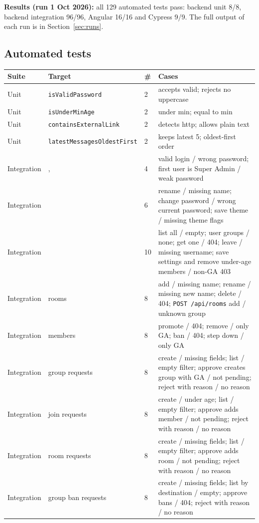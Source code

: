 \documentclass[10pt,a4paper]{article}
\newcommand{\ep}[1]{\texttt{\small #1}}
\begin{document}
\textbf{Results (run 1 Oct 2026):} all 129 automated tests pass: backend unit 8/8, backend integration 96/96, Angular 16/16 and Cypress 9/9. The full output of each run is in Section~\ref{sec:runs}.

\subsection{Automated tests}
\small
\begin{longtable}{L{1.8cm} L{4.2cm} L{0.5cm} L{8.8cm}}
\toprule
\textbf{Suite} & \textbf{Target} & \textbf{\#} & \textbf{Cases}\\
\midrule
\endhead
Unit & \ep{isValidPassword} & 2 & accepts valid; rejects no uppercase\\
Unit & \ep{isUnderMinAge} & 2 & under min; equal to min\\
Unit & \ep{containsExternalLink} & 2 & detects http; allows plain text\\
Unit & \ep{latestMessagesOldestFirst} & 2 & keeps latest 5; oldest-first order\\
\midrule
Integration & ,  & 4 & valid login / wrong password; first user is Super Admin / weak password\\
Integration &  & 6 & rename / missing name; change password / wrong current password; save theme / missing theme flags\\
Integration &  & 10 & list all / empty; user groups / none; get one / 404; leave / missing username; save settings and remove under-age members / non-GA 403\\
Integration & rooms & 8 & add / missing name; rename / missing new name; delete / 404; \ep{POST /api/rooms} add / unknown group\\
Integration & members & 8 & promote / 404; remove / only GA; ban / 404; step down / only GA\\
Integration & group requests & 8 & create / missing fields; list / empty filter; approve creates group with GA / not pending; reject with reason / no reason\\
Integration & join requests & 8 & create / under age; list / empty filter; approve adds member / not pending; reject with reason / no reason\\
Integration & room requests & 8 & create / missing fields; list / empty filter; approve adds room / not pending; reject with reason / no reason\\
Integration & group ban requests & 8 & create / missing fields; list by destination / empty; approve bans / 404; reject with reason / no reason\\

\end{longtable}
\end{document}
